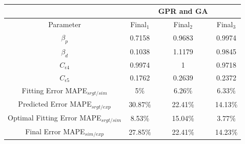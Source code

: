 \begin{minipage}{\linewidth}
	\centering
	\renewcommand\arraystretch{0.95}
	~\\
	\label{tab:GA table} 
	\begin{tabular}{cccc}
		\hline
		{\small } &{\small } &{GPR and GA}\\
		\hline
		{\small Parameter} & {\small Final${_1}$} & {\small Final${_2}$} & {\small Final${_3}$}\\
		\hline
		{$\beta_{p}$} & 0.7158 & 0.9683 & 0.9974 \\
		{$\beta_{d}$} & 0.1038 & 1.1179 & 0.9845 \\
		{$C_{\epsilon4}$} & 0.9974 & 1 & 0.9718 \\
		{$C_{\epsilon5}$} & 0.1762 & 0.2639 & 0.2372\\
		\hline
		{Fitting Error MAPE$_{srgt/sim}$} & 5${\%}$ & 6.26${\%}$ & 6.33${\%}$\\
		{Predicted Error MAPE$_{srgt/exp}$} & 30.87${\%}$ & 22.41${\%}$ & 14.13${\%}$\\
		{Optimal Fitting Error MAPE$_{srgt/sim}$} & 8.53${\%}$ & 15.04${\%}$ & 3.77${\%}$\\
		{Final Error MAPE$_{sim/exp}$} & 27.85${\%}$ & 22.41${\%}$ & 14.23${\%}$\\
		\hline
	\end{tabular}
\end{minipage}

